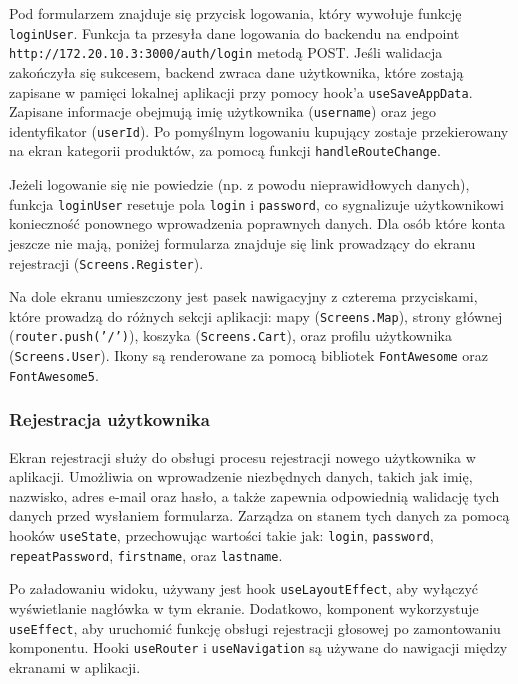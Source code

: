 Pod formularzem znajduje się przycisk logowania, który wywołuje funkcję \texttt{loginUser}. Funkcja ta przesyła dane logowania do backendu na endpoint \texttt{http://172.20.10.3:3000/auth/login} metodą POST. Jeśli walidacja zakończyła się sukcesem, backend zwraca dane użytkownika, które zostają zapisane w pamięci lokalnej aplikacji przy pomocy hook'a \texttt{useSaveAppData}. Zapisane informacje obejmują imię użytkownika (\texttt{username}) oraz jego identyfikator (\texttt{userId}). Po pomyślnym logowaniu kupujący zostaje przekierowany na ekran kategorii produktów, za pomocą funkcji \texttt{handleRouteChange}.

Jeżeli logowanie się nie powiedzie (np. z powodu nieprawidłowych danych), funkcja \texttt{loginUser} resetuje pola \texttt{login} i \texttt{password}, co sygnalizuje użytkownikowi konieczność ponownego wprowadzenia poprawnych danych. Dla osób które konta jeszcze nie mają, poniżej formularza znajduje się link prowadzący do ekranu rejestracji (\texttt{Screens.Register}). 

Na dole ekranu umieszczony jest pasek nawigacyjny z czterema przyciskami, które prowadzą do różnych sekcji aplikacji: mapy (\texttt{Screens.Map}), strony głównej (\texttt{router.push('/')}), koszyka (\texttt{Screens.Cart}), oraz profilu użytkownika (\texttt{Screens.User}). Ikony są renderowane za pomocą bibliotek \texttt{FontAwesome} oraz \texttt{FontAwesome5}.

\subsubsection{Rejestracja użytkownika}

Ekran rejestracji służy do obsługi procesu rejestracji nowego użytkownika w aplikacji. Umożliwia on wprowadzenie niezbędnych danych, takich jak imię, nazwisko, adres e-mail oraz hasło, a także zapewnia odpowiednią walidację tych danych przed wysłaniem formularza. Zarządza on stanem tych danych za pomocą hooków \texttt{useState}, przechowując wartości takie jak: \texttt{login}, \texttt{password}, \texttt{repeatPassword}, \texttt{firstname}, oraz \texttt{lastname}. 

Po załadowaniu widoku, używany jest hook \texttt{useLayoutEffect}, aby wyłączyć wyświetlanie nagłówka w tym ekranie. Dodatkowo, komponent wykorzystuje \texttt{useEffect}, aby uruchomić funkcję obsługi rejestracji głosowej po zamontowaniu komponentu. Hooki \texttt{useRouter} i \texttt{useNavigation} są używane do nawigacji między ekranami w aplikacji.

